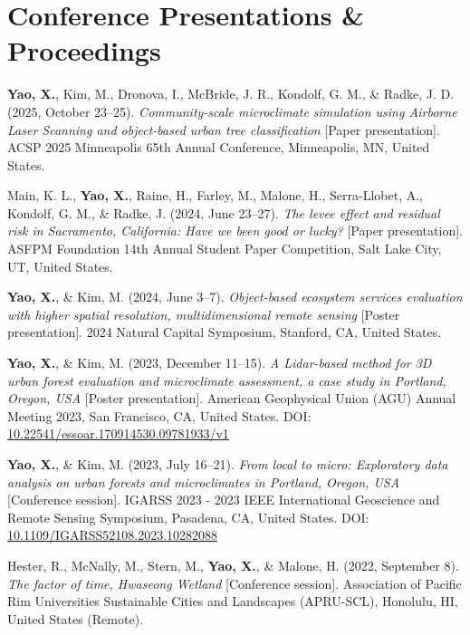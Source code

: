 \documentclass[a4paper,12pt]{article}
\begin{document}
\section{Conference Presentations \& Proceedings}

\begin{etaremune}[leftmargin=1.5em, itemsep=0.7em, start=6]
    \item \textbf{Yao, X.}, Kim, M., Dronova, I., McBride, J. R., Kondolf, G. M., \& Radke, J. D. (2025, October 23--25). \textit{Community-scale microclimate simulation using Airborne Laser Scanning and object-based urban tree classification} [Paper presentation]. ACSP 2025 Minneapolis 65th Annual Conference, Minneapolis, MN, United States.
    
    \item Main, K. L., \textbf{Yao, X.}, Raine, H., Farley, M., Malone, H., Serra-Llobet, A., Kondolf, G. M., \& Radke, J. (2024, June 23--27). \textit{The levee effect and residual risk in Sacramento, California: Have we been good or lucky?} [Paper presentation]. ASFPM Foundation 14th Annual Student Paper Competition, Salt Lake City, UT, United States.

    \item \textbf{Yao, X.}, \& Kim, M. (2024, June 3--7). \textit{Object-based ecosystem services evaluation with higher spatial resolution, multidimensional remote sensing} [Poster presentation]. 2024 Natural Capital Symposium, Stanford, CA, United States.

    \item \textbf{Yao, X.}, \& Kim, M. (2023, December 11--15). \textit{A Lidar-based method for 3D urban forest evaluation and microclimate assessment, a case study in Portland, Oregon, USA} [Poster presentation]. American Geophysical Union (AGU) Annual Meeting 2023, San Francisco, CA, United States. DOI: \href{https://doi.org/10.22541/essoar.170914530.09781933/v1}{10.22541/essoar.170914530.09781933/v1}

    \item \textbf{Yao, X.}, \& Kim, M. (2023, July 16--21). \textit{From local to micro: Exploratory data analysis on urban forests and microclimates in Portland, Oregon, USA} [Conference session]. IGARSS 2023 - 2023 IEEE International Geoscience and Remote Sensing Symposium, Pasadena, CA, United States. DOI: \href{https://doi.org/10.1109/IGARSS52108.2023.10282088}{10.1109/IGARSS52108.2023.10282088}

    \item Hester, R., McNally, M., Stern, M., \textbf{Yao, X.}, \& Malone, H. (2022, September 8). \textit{The factor of time, Hwaseong Wetland} [Conference session]. Association of Pacific Rim Universities Sustainable Cities and Landscapes (APRU-SCL), Honolulu, HI, United States (Remote).
\end{etaremune}
\end{document}
